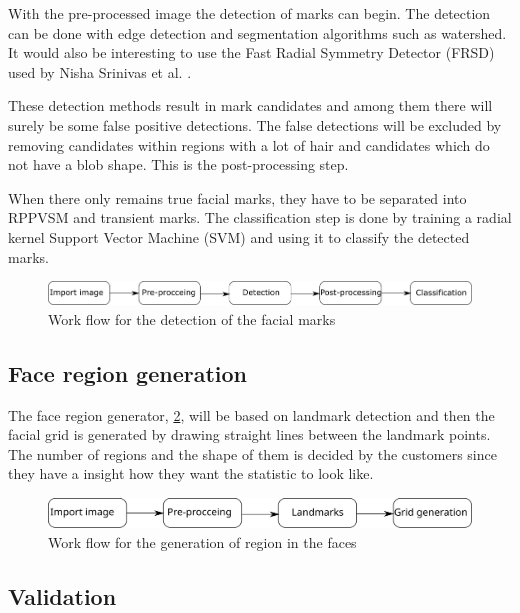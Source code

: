 With the pre-processed image the detection of marks can begin. The detection can be done with edge detection and segmentation algorithms such as watershed. It would also be interesting to use the Fast Radial Symmetry Detector (FRSD) used by Nisha Srinivas et al. \cite{automatic_detector_2015}. 

These detection methods result in mark candidates and among them there will surely be some false positive detections. The false detections will be excluded by removing candidates within regions with a lot of hair and candidates which do not have a blob shape. This is the post-processing step. \cite{automatic_detector_2015}

When there only remains true facial marks, they have to be separated into RPPVSM and transient marks. The classification step is done by training a radial kernel Support Vector Machine (SVM) and using it to classify the detected marks.  

\begin{figure}[H]
\centering
\includegraphics[width=1.0\linewidth]{"bilder/detection_flow"}
\caption{Work flow for the detection of the facial marks}
\label{fig:detection_flow}
\end{figure}

\subsection{Face region generation}

The face region generator, \cref{fig:grid_flow}, will be based on landmark detection and then the facial grid is generated by drawing straight lines between the landmark points. \cite{landmarks_SVM,landmarks_wild} The number of regions and the shape of them is decided by the customers since they have a insight how they want the statistic to look like. 

\begin{figure}[H]
	\centering
	\includegraphics[width=1.0\linewidth]{"bilder/Grid_flow"}
	\caption{Work flow for the generation of region in the faces}
	\label{fig:grid_flow}
\end{figure}

\subsection{Validation}

